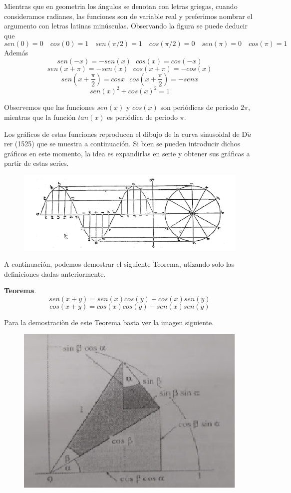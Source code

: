 \documentclass[a4paper,10pt,BCOR10mm,oneside,headsepline]{scrbook}
\begin{document}
Mientras que en geometria los ángulos se denotan con letras griegas, cuando consideramos radianes, las funciones son de variable real y preferimos nombrar el argumento con letras latinas minúsculas. Observando la figura se puede deducir que
\[sen(0)=0 \quad cos(0)=1 \quad sen(\pi/2)=1 \quad cos(\pi/2)=0 \quad sen(\pi)=0 \quad cos(\pi)=1\] Además
\[ sen(-x) = -sen(x)\ \ \ cos(x) = cos(-x)  \]
\[ sen(x+\pi) = -sen(x)\ \ \ cos(x+\pi) = -cos(x)  \]
\[sen(x + \frac{\pi}{2}) = cos x\ \ \ cos(x + \frac{\pi}{2}) = -sen x  \]
\[ sen(x)^2+cos(x)^2 =1  \]

Observemos que las funciones $sen(x)$ y $cos(x)$ son periódicas de periodo $2\pi$, mientras que la función $tan(x)$ es periódica de periodo $\pi$.

Los gráficos de estas funciones reproducen el dibujo de la curva sinusoidal de D$\ddot{u}$rer (1525) que se muestra a continuación. Si bien se pueden introducir dichos gráficos en este momento, la idea es expandirlas en serie y obtener sus gráficas a partir de estas series.

\begin{figure}[h!]
\centering
    \includegraphics[width=1\linewidth]{trig2.png}
  \label{fig:ejemplo1}
\end{figure}

A continuación, podemos demostrar el siguiente Teorema, utizando solo las definiciones dadas anteriormente.

\textbf{Teorema}. \begin{equation}\label{4.3}
sen(x+y)=sen(x)cos(y)+cos(x)sen(y)
\end{equation} 
\begin{equation}\label{4.4}
cos(x+y)=cos(x)cos(y)-sen(x)sen(y)
\end{equation} 

Para la demostraciòn de este Teorema basta ver la imagen siguiente.

 \begin{figure}[h!]
    \centering				                     	\includegraphics[width=0.60\linewidth]{teortrig.png}
\end{figure}
\end{document}
